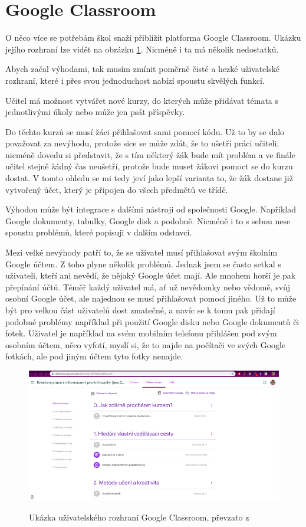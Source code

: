 \section{Google Classroom}

O něco více se potřebám škol snaží přiblížit platforma Google Classroom. Ukázku jejího rozhraní lze vidět na obrázku \ref{img:google_classroom}. Nicméně i ta má několik nedostatků.

Abych začal výhodami, tak musím zmínit poměrně čisté a hezké uživatelské rozhraní, které i přes svou jednoduchost nabízí spoustu skvělých funkcí.

Učitel má možnost vytvářet nové kurzy, do kterých může přidávat témata s jednotlivými úkoly nebo může jen psát příspěvky.

Do těchto kurzů se musí žáci přihlašovat sami pomocí kódu. Už to by se dalo považovat za nevýhodu, protože sice se může zdát, že to ušetří práci učiteli, nicméně dovedu si představit, že s tím některý žák bude mít problém a ve finále učitel stejně žádný čas neušetří, protože bude muset žákovi pomoct se do kurzu dostat. V tomto ohledu se mi tedy jeví jako lepší varianta to, že žák dostane již vytvořený účet, který je připojen do všech předmětů ve třídě.

Výhodou může být integrace s dalšími nástroji od společnosti Google. Například Google dokumenty, tabulky, Google disk a podobně. Nicméně i to s sebou nese spoustu problémů, které popisuji v dalším odstavci.

Mezi velké nevýhody patří to, že se uživatel musí přihlašovat svým školním Google účtem. Z toho plyne několik problémů. Jednak jsem se často setkal s uživateli, kteří ani nevědí, že nějaký Google účet mají. Ale mnohem horší je pak přepínání účtů. Téměř každý uživatel má, ať už nevědomky nebo vědomě, svůj osobní Google účet, ale najednou se musí přihlašovat pomocí jiného. Už to může být pro velkou část uživatelů dost zmatečné, a navíc se k tomu pak přidají podobné problémy například při použití Google disku nebo Google dokumentů či fotek. Uživatel je například na svém mobilním telefonu přihlášen pod svým osobním účtem, něco vyfotí, myslí si, že to najde na počítači ve svých Google fotkách, ale pod jiným účtem tyto fotky nenajde.

\begin{figure}[H]
    \caption{Ukázka uživatelského rozhraní Google Classroom, převzato z \cite{google_classroom}}
    \centering
    \includegraphics[width=\textwidth]{images/google_classroom}
    \label{img:google_classroom}
\end{figure}

